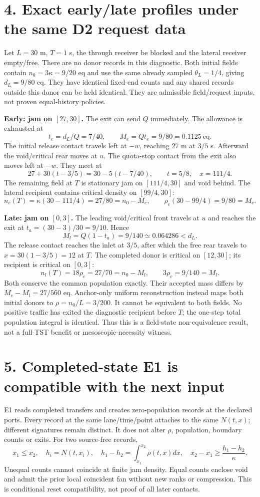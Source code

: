 \documentclass[11pt,a4paper]{article}
\begin{document}
\newpage
\section*{4. Exact early/late profiles under the same D2 request data}
Let $L=30$ m, $T=1$ s, the through receiver be blocked and the lateral
receiver empty/free. There are no donor records in this diagnostic.
Both initial fields contain $n_0=3\kappa=9/20$ eq and use the same already
sampled $\theta_L=1/4$, giving $d_L=9/80$ eq. They have identical fixed-end
counts and any shared records outside this donor can be held identical.
They are admissible field/request inputs, not proven equal-history policies.

\textbf{Early: jam on $[27,30]$.} The exit can send $Q$ immediately.
The allowance is exhausted at
\[
 t_e=d_L/Q=7/40,\qquad M_e=Q t_e=9/80=0.1125\ \mathrm{eq}.
\]
The initial release contact travels left at $-w$, reaching 27 m at $3/5$ s.
Afterward the void/critical rear moves at $u$. The quota-stop contact from
the exit also moves left at $-w$. They meet at
\[
 27+30(t-3/5)=30-5(t-7/40),\qquad t=5/8,\quad x=111/4.
\]
The remaining field at $T$ is stationary jam on $[111/4,30]$ and void behind.
The lateral recipient contains critical density on $[99/4,30]$:
\[
 n_e(T)=\kappa(30-111/4)=27/80=n_0-M_e,
 \qquad \rho_c(30-99/4)=9/80=M_e.
\]

\textbf{Late: jam on $[0,3]$.} The leading void/critical front travels at
$u$ and reaches the exit at $t_a=(30-3)/30=9/10$. Hence
\[
 M_l=Q(1-t_a)=9/140\simeq0.064286<d_L.
\]
The release contact reaches the inlet at $3/5$, after which the free rear
travels to $x=30(1-3/5)=12$ at $T$. The completed donor is critical on
$[12,30]$; its recipient is critical on $[0,3]$:
\[
 n_l(T)=18\rho_c=27/70=n_0-M_l,\qquad 3\rho_c=9/140=M_l.
\]
Both conserve the common population exactly. Their accepted mass differs by
$M_e-M_l=27/560$ eq. Anchor-only uniform reconstruction instead maps both
initial donors to $\rho=n_0/L=3/200$. It cannot be equivalent to both fields.
No positive traffic has exited the diagnostic recipient before $T$; the
one-step total population integral is identical. Thus this is a field-state
non-equivalence result, not a full-TST benefit or mesoscopic-necessity witness.

\newpage
\section*{5. Completed-state E1 is compatible with the next input}
E1 reads completed transfers and creates zero-population records at the
declared ports. Every record at the same lane/time/point attaches to the same
$N(t,x)$; different signatures remain distinct. It does not alter $\rho$,
population, boundary counts or exits. For two source-free records,
\[
 x_1\le x_2,\quad h_i=N(t,x_i),\quad
 h_1-h_2=\int_{x_1}^{x_2}\rho(t,x)dx,
 \quad x_2-x_1\ge\frac{h_1-h_2}{\kappa}.
\]
Unequal counts cannot coincide at finite jam density. Equal counts enclose
void and admit the prior local coincident fan without new ranks or compression.
This is conditional reset compatibility, not proof of all later contacts.
\end{document}

